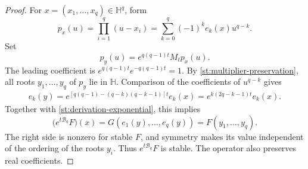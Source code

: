 \documentclass[reqno, 12pt]{article}
\numberwithin{equation}{section}
\theoremstyle{definition}
\begin{document}
\begin{proof}
For $x=(x_1,\ldots,x_q)\in\mathbb H^q$, form
\[
p_x(u)=\prod_{i=1}^q(u-x_i)
=\sum_{k=0}^q(-1)^k e_k(x)u^{q-k}.
\]
Set
\begin{equation}\label{st:root-lift}
p_y(u)=e^{q(q-1)t}M_t p_x(u).
\end{equation}
The leading coefficient is
$e^{q(q-1)t}e^{-q(q-1)t}=1$.
By \cref{st:multiplier-preservation}, all roots
$y_1,\ldots,y_q$ of $p_y$ lie in $\mathbb H$.
Comparison of the coefficients of $u^{q-k}$ gives
\begin{align}\label{st:root-lift-coefficients}
e_k(y)=e^{[q(q-1)-(q-k)(q-k-1)]t}e_k(x)=e^{k(2q-k-1)t}e_k(x).
\end{align}
Together with \eqref{st:derivation-exponential}, this implies
\[
\bigl(e^{t\mathcal B_q}F\bigr)(x)
=G(e_1(y),\ldots,e_q(y))=F(y_1,\ldots,y_q).
\]
The right side is nonzero for stable $F$, and symmetry makes
its value independent of the ordering of the roots $y_i$.
Thus $e^{t\mathcal B_q}F$ is stable.  The operator also preserves
real coefficients.
\end{proof}
\end{document}
